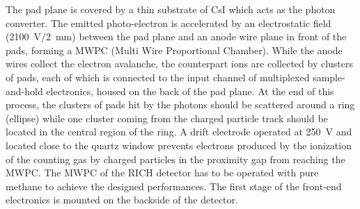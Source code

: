 The pad plane
 is covered by a thin substrate of CsI which
acts as the photon converter. The emitted photo-electron is
accelerated by an electrostatic field (2100~V$/2$~mm) 
between the pad plane and
an anode wire plane in front of the pads,
 forming a MWPC (Multi Wire Proportional Chamber). 
While the anode wires collect the electron avalanche, the counterpart 
ions are collected by clusters of pads, each of which is connected to the
input channel of multiplexed sample-and-hold electronics, housed on the
back of the pad plane.
At the end of this process, the
clusters of pads hit by the photons should be
scattered around a ring (ellipse) while 
one cluster coming from the charged particle track
should be located in the central region of the ring.
A drift electrode operated at 250~V and located close to the quartz window
prevents electrons produced by the ionization of the counting gas by charged 
particles in the proximity gap from reaching the MWPC. The MWPC of the RICH detector 
has to be operated with pure methane to achieve the 
designed performances. The first stage of the front-end electronics is mounted on the 
backside of the detector. 

